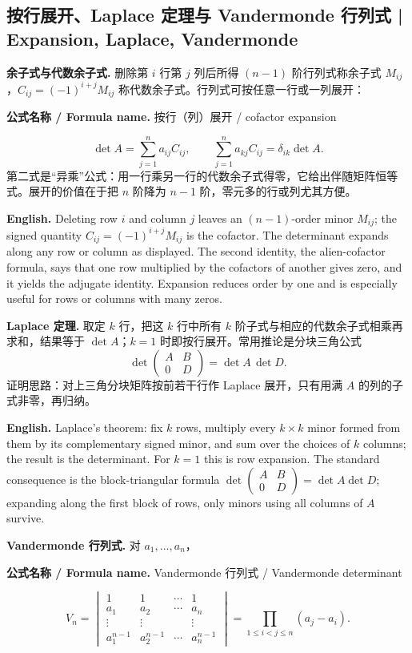 \documentclass[UTF8,11pt,a4paper]{ctexart}
\newcommand{\EN}[1]{\par\noindent\textbf{English.} #1\par}
\newcommand{\FORMULA}[2]{\par\noindent\textbf{公式名称 / Formula name.} #1 / #2\par}
\begin{document}
\subsection{按行展开、Laplace 定理与 Vandermonde 行列式 | Expansion, Laplace, Vandermonde}
\noindent\textbf{余子式与代数余子式.} 删除第 $i$ 行第 $j$ 列后所得 $(n-1)$ 阶行列式称余子式 $M_{ij}$，$C_{ij}=(-1)^{i+j}M_{ij}$ 称代数余子式。行列式可按任意一行或一列展开：
\FORMULA{按行（列）展开}{cofactor expansion}
\[
\det A=\sum_{j=1}^n a_{ij}C_{ij},\qquad
\sum_{j=1}^n a_{kj}C_{ij}=\delta_{ik}\det A.
\]
第二式是“异乘”公式：用一行乘另一行的代数余子式得零，它给出伴随矩阵恒等式。展开的价值在于把 $n$ 阶降为 $n-1$ 阶，零元多的行或列尤其方便。
\EN{Deleting row $i$ and column $j$ leaves an $(n-1)$-order minor $M_{ij}$; the signed quantity $C_{ij}=(-1)^{i+j}M_{ij}$ is the cofactor. The determinant expands along any row or column as displayed. The second identity, the alien-cofactor formula, says that one row multiplied by the cofactors of another gives zero, and it yields the adjugate identity. Expansion reduces order by one and is especially useful for rows or columns with many zeros.}
\noindent\textbf{Laplace 定理.} 取定 $k$ 行，把这 $k$ 行中所有 $k$ 阶子式与相应的代数余子式相乘再求和，结果等于 $\det A$；$k=1$ 时即按行展开。常用推论是分块三角公式
\[
\det\begin{pmatrix}A&B\\0&D\end{pmatrix}=\det A\,\det D.
\]
证明思路：对上三角分块矩阵按前若干行作 Laplace 展开，只有用满 $A$ 的列的子式非零，再归纳。
\EN{Laplace's theorem: fix $k$ rows, multiply every $k\times k$ minor formed from them by its complementary signed minor, and sum over the choices of $k$ columns; the result is the determinant. For $k=1$ this is row expansion. The standard consequence is the block-triangular formula $\det\begin{pmatrix}A&B\\0&D\end{pmatrix}=\det A\det D$; expanding along the first block of rows, only minors using all columns of $A$ survive.}
\noindent\textbf{Vandermonde 行列式.} 对 $a_1,\dots,a_n$，
\FORMULA{Vandermonde 行列式}{Vandermonde determinant}
\[
V_n=\begin{vmatrix}
1&1&\cdots&1\\
a_1&a_2&\cdots&a_n\\
\vdots&\vdots&&\vdots\\
a_1^{n-1}&a_2^{n-1}&\cdots&a_n^{n-1}
\end{vmatrix}=\prod_{1\le i<j\le n}(a_j-a_i).
\]
\end{document}
